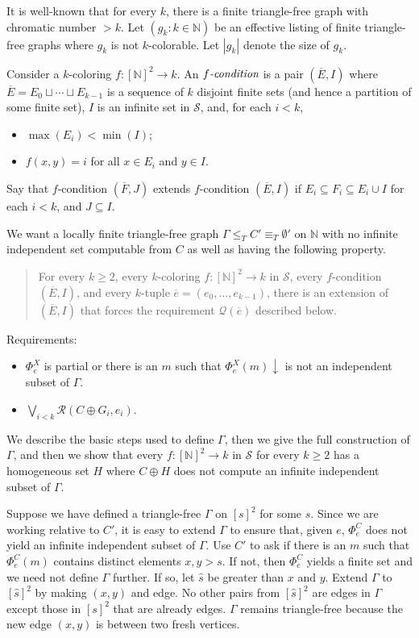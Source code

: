 \documentclass{article}
\def\Q{\mathcal{Q}}
\def\R{\mathcal{R}}
\def\Sc{\mathcal{S}}
\def\Q{\mathcal{Q}}
\newcommand{\converge}{\!\!\downarrow}
\newcommand{\NN}[0]{\mathbb{N}}
\newcommand{\ol}[1]{\overline{#1}}
\numberwithin{theorem}{section}
\begin{document}
It is well-known that for every $k$, there is a finite triangle-free graph with chromatic number $>\! k$.  Let $(g_k : k \in \NN)$ be an effective listing of finite triangle-free graphs where $g_k$ is not $k$-colorable.  Let $|g_k|$ denote the size of $g_k$.

Consider a $k$-coloring $f : [\NN]^2 \to k$.  An $\emph{$f$-condition}$ is a pair $(\ol{E}, I)$ where $\ol{E} = E_0 \sqcup \cdots \sqcup E_{k-1}$ is a sequence of $k$ disjoint finite sets (and hence a partition of some finite set), $I$ is an infinite set in $\Sc$, and, for each $i < k$,
\begin{itemize}
\item $\max(E_i) < \min(I)$;
\item $f(x,y) = i$ for all $x \in E_i$ and $y \in I$.
\end{itemize}
Say that $f$-condition $(\ol{F}, J)$ extends $f$-condition $(\ol{E}, I)$ if $E_i \subseteq F_i \subseteq E_i \cup I$ for each $i < k$, and $J \subseteq I$.

We want a locally finite triangle-free graph $\Gamma \leq_T C' \equiv_T \emptyset'$ on  $\NN$ with no infinite independent set computable from $C$ as well as having the following property.
\begin{quote}
For every $k \geq 2$, every $k$-coloring $f : [\NN]^2 \to k$ in $\Sc$, every $f$-condition $(\ol{E}, I)$, and every $k$-tuple $\ol{e} = (e_0, \dots, e_{k-1})$, there is an extension of $(\ol{E}, I)$ that forces the requirement $\Q(\ol{e})$ described below.
\end{quote}

Requirements:
\begin{itemize}
\item[$\R(X, e)$:]  $\Phi_e^X$ is partial or there is an $m$ such that $\Phi_e^X(m)\converge$ is not an independent subset of $\Gamma$.

\smallskip

\item[$\Q(\ol{e})$:]  $\bigvee_{i < k} \R(C \oplus G_i, e_i)$.
\end{itemize}

We describe the basic steps used to define $\Gamma$, then we give the full construction of $\Gamma$, and then we show that every $f : [\NN]^2 \to k$ in $\Sc$ for every $k \geq 2$ has a homogeneous set $H$ where $C \oplus H$ does not compute an infinite independent subset of $\Gamma$.

Suppose we have defined a triangle-free $\Gamma$ on $[s]^2$ for some $s$.  Since we are working relative to $C'$, it is easy to extend $\Gamma$ to ensure that, given $e$, $\Phi_e^C$ does not yield an infinite independent subset of $\Gamma$.  Use $C'$ to ask if there is an $m$ such that $\Phi_e^C(m)$ contains distinct elements $x, y > s$.  If not, then $\Phi_e^C$ yields a finite set and we need not define $\Gamma$ further.  If so, let $\hat{s}$ be greater than $x$ and $y$.  Extend $\Gamma$ to $[\hat{s}]^2$ by making $(x,y)$ and edge.  No other pairs from $[\hat{s}]^2$ are edges in $\Gamma$ except those in $[s]^2$ that are already edges.  $\Gamma$ remains triangle-free because the new edge $(x,y)$ is between two fresh vertices.
\end{document}
